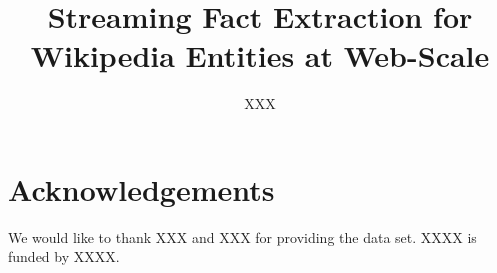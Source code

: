 \documentclass[letterpaper]{article}
\newcommand\hide[2]{#2}
\begin{document}
\title{Streaming Fact Extraction for Wikipedia Entities at Web-Scale}





\author{XXX}



\maketitle







%







\section*{Acknowledgements}
We would like to thank \hide{John Frank}{XXX} and \hide{NIST}{XXX} for providing the data set.
\hide{Christan Grant}{XXXX} is funded by \hide{a National Science Foundation Graduate Research Fellowship under Grant No. DGE-0802270}{XXXX}. 



%
%




%
\end{document}
